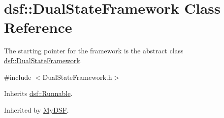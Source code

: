 \hypertarget{classdsf_1_1_dual_state_framework}{}\section{dsf\+:\+:Dual\+State\+Framework Class Reference}
\label{classdsf_1_1_dual_state_framework}


The starting pointer for the framework is the abstract class \hyperlink{classdsf_1_1_dual_state_framework}{dsf\+::\+Dual\+State\+Framework}.  




{\ttfamily \#include $<$Dual\+State\+Framework.\+h$>$}



Inherits \hyperlink{classdsf_1_1_runnable}{dsf\+::\+Runnable}.



Inherited by \hyperlink{class_my_d_s_f}{My\+D\+S\+F}.

